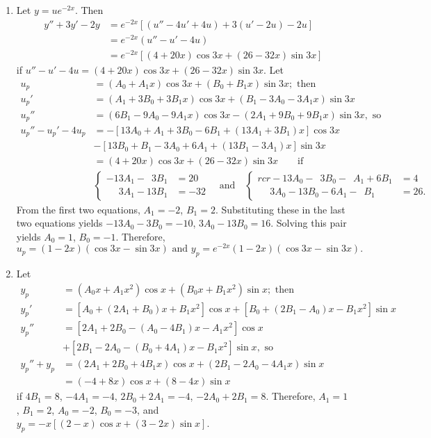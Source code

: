 \documentclass[openany]{book}
\newenvironment{sectionSolutions}{
 \begin{enumerate}[item-label={\thesection.\arabic{enumi}.}]
}{
 \end{enumerate}
}
\begin{document}
\begin{sectionSolutions}
\item
Let $y=ue^{-2x}$. Then
\begin{align*}
y''+3y'-2y&=e^{-2x}\left[(u''-4u'+4u)+3(u'-2u)-2u\right]\\
&=e^{-2x}(u''-u'-4u)\\
&=e^{-2x}\left[(4+20x)\cos 3x+(26-32x)\sin 3x\right]
\end{align*}
if $u''-u'-4u=(4+20x)\cos 3x+(26-32x)\sin 3x$.
Let
\begin{align*}
u_p&=(A_0+A_1x)\cos3x+(B_0+B_1x)\sin3x; \text{ then}\\
u_p'&=(A_1+3B_0+3B_1x)\cos3x+(B_1-3A_0-3A_1x)\sin3x\\
u_p''&=(6B_1-9A_0-9A_1x)\cos3x-(2A_1+9B_0+9B_1x)\sin3x,\text{ so}\\
u_p''-u_p'-4u_p&=-\left[13A_0+A_1+3B_0-6B_1+(13A_1+3B_1)x\right]\cos3x\\
&-\left[13B_0+B_1-3A_0+6A_1+(13B_1-3A_1)x\right]\sin3x\\
&=(4+20x)\cos 3x+(26-32x)\sin 3x\qquad\text{if}\\
&\begin{cases}
-13A_1-\phantom{1}3B_1&=20\\ \phantom{-1}3A_1-13B_1&=-32
\end{cases}
\quad\text{and}\quad
\begin{cases}{rcr}
-13A_0-\phantom{1}3B_0-\phantom{6}A_1+6B_1&=4\\
\phantom{-1}3A_0-13B_0-6A_1-\phantom{6}B_1&=26.
\end{cases}
\end{align*}
From the first two equations, $A_1=-2$, $B_1=2$. Substituting these in
the last two equations yields $-13A_0-3B_0=-10$, $3A_0-13B_0=16$.
Solving this pair yields $A_0=1$, $B_0=-1$. Therefore,
\[
 u_p=(1-2x)(\cos 3x-\sin 3x) \text{ and }
y_p=e^{-2x}(1-2x)(\cos 3x-\sin 3x).
\]


\item
Let
\begin{align*}
y_p&=(A_0x+A_1x^2)\cos x+(B_0x+B_1x^2)\sin x;\text{ then}\\
y_p'&=\left[A_0+(2A_1+B_0)x+B_1x^2\right]\cos x
+\left[B_0+(2B_1-A_0)x-B_1x^2\right]\sin x\\
y_p''&=
\left[2A_1+2B_0-(A_0-4B_1)x-A_1x^2\right]\cos x\\
&+\left[2B_1-2A_0-(B_0+4A_1)x-B_1x^2\right]\sin x, \text{ so}\\
y_p''+y_p&=(2A_1+2B_0+4B_1x)\cos x+(2B_1-2A_0-4A_1x)\sin x\\
&=(-4+8x)\cos x+(8-4x)\sin x
\end{align*}
if $4B_1=8$, $-4A_1=-4$, $2B_0+2A_1=-4$, $-2A_0+2B_1=8$. Therefore,
$A_1=1$, $B_1=2$, $A_0=-2$, $B_0=-3$, and $y_p=-x\left[(2-x)\cos
x+(3-2x)\sin x\right]$.




\end{sectionSolutions}
\end{document}
